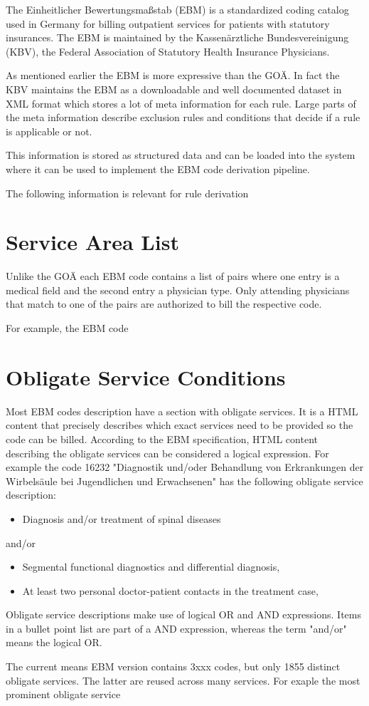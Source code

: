 The Einheitlicher Bewertungsmaßstab (EBM) is a standardized coding catalog used in Germany for billing outpatient services for patients with statutory insurances.
The EBM is maintained by the Kassenärztliche Bundesvereinigung (KBV), the Federal Association of Statutory Health Insurance Physicians\cite[]{hermanns2015ebm}.

As mentioned earlier the EBM is more expressive than the GOÄ.
In fact the KBV maintains the EBM as a downloadable and well documented dataset in XML format which stores a lot of meta information for each rule.
Large parts of the meta information describe exclusion rules and conditions that decide if a rule is applicable or not.

This information is stored as structured data and can be loaded into the system where it can be used to implement the EBM code derivation pipeline.

The following information is relevant for rule derivation
\section{Service Area List}\label{sec:service-area-list}
Unlike the GOÄ each EBM code contains a list of pairs where one entry is a medical field and the second entry a physician type.
Only attending physicians that match to one of the pairs are authorized to bill the respective code.

For example, the EBM code


\section{Obligate Service Conditions}\label{sec:obligate-service-conditions}
Most EBM codes description have a section with obligate services.
It is a HTML content that precisely describes which exact services need to be provided so the code can be billed.
According to the EBM specification, HTML content describing the obligate services can be considered a logical expression.
For example the code 16232 "Diagnostik und/oder Behandlung von Erkrankungen der Wirbelsäule bei Jugendlichen und Erwachsenen" has the following obligate service description:


\begin{itemize}
    \item Diagnosis and/or treatment of spinal diseases
\end{itemize}
and/or
\begin{itemize}
    \item Segmental functional diagnostics and differential diagnosis,
    \item At least two personal doctor-patient contacts in the treatment case,
\end{itemize}

Obligate service descriptions make use of logical OR and AND expressions.
Items in a bullet point list are part of a AND expression, whereas the term "and/or" means the logical OR.

The current means EBM version contains 3xxx codes, but only 1855 distinct obligate services.
The latter are reused across many services. For exaple the most prominent obligate service
